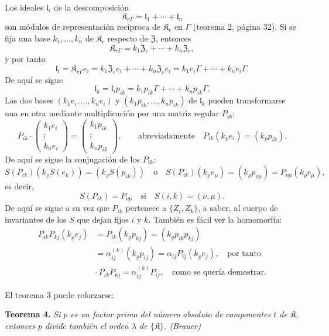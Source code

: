 Los ideales \(\mathfrak l_i\) de la descomposición
\[
\mathfrak K_{r\Gamma}=\mathfrak l_1+\cdots+\mathfrak l_n
\]
son módulos de representación recíproca de \(\mathfrak K_r\) en \(\Gamma\) (teorema 2, página 32). Si se fija una base \(k_1,\ldots,k_n\) de \(\mathfrak K_r\) respecto de \(\mathfrak Z\), entonces
\[
\mathfrak K_{r\Gamma}=k_1\mathfrak Z_r+\cdots+k_n\mathfrak Z_r,
\]
y por tanto
\[
\mathfrak l_i=\mathfrak K_{r\Gamma}e_i
=k_1\mathfrak Z_r e_i+\cdots+k_n\mathfrak Z_r e_i
=k_1e_i\Gamma+\cdots+k_ne_i\Gamma.
\]
De aquí se sigue
\[
\mathfrak l_k=\mathfrak l_i p_{ik}
=k_1p_{ik}\Gamma+\cdots+k_np_{ik}\Gamma.
\]
Las dos bases \((k_1e_i,\ldots,k_ne_i)\) y \((k_1p_{ik},\ldots,k_np_{ik})\) de \(\mathfrak l_k\) pueden transformarse una en otra mediante multiplicación por una matriz regular \(P_{ik}\):
\[
P_{ik}\cdot
\begin{pmatrix}
k_1e_i\\ \vdots\\ k_ne_i
\end{pmatrix}
=
\begin{pmatrix}
k_1p_{ik}\\ \vdots\\ k_np_{ik}
\end{pmatrix},
\qquad
\text{abreviadamente}\quad
P_{ik}(k_\varrho e_i)=(k_\varrho p_{ik}).
\]
De aquí se sigue la conjugación de los \(P_{ik}\):
\[
S(P_{ik})(k_\varrho S(e_k))=(k_\varrho S(p_{ik}))
\quad\text{o}\quad
S(P_{ik})(k_\varrho e_\mu)=(k_\varrho p_{\nu\mu})
=P_{\nu\mu}(k_\varrho e_\mu),
\]
es decir,
\[
S(P_{ik})=P_{\nu\mu}\quad\text{si}\quad S(i,k)=(\nu,\mu).
\]
De aquí se sigue a su vez que \(P_{ik}\) pertenece a \(\{Z_i,Z_k\}\), a saber, al cuerpo de invariantes de los \(S\) que dejan fijos \(i\) y \(k\). También es fácil ver la homomorfía:
\[
\begin{split}
P_{ik}P_{kj}(k_\varrho e_j)
&=P_{ik}(k_\varrho p_{kj})
=(k_\varrho p_{ik}p_{kj})\\
&=\alpha_{ij}^{(k)}(k_\varrho p_{ij})
=\alpha_{ij}P_{ij}(k_\varrho e_j),
\quad\text{por tanto}\\
&\cdot\, P_{ik}P_{kj}=\alpha_{ij}^{(k)}P_{ij},
\quad\text{como se quería demostrar.}
\end{split}
\]

El teorema 3 puede reforzarse:

\textbf{Teorema 4.} \emph{Si \(p\) es un factor primo del número absoluto de componentes \(t\) de \(\mathfrak K\), entonces \(p\) divide también el orden \(\lambda\) de \(\{\mathfrak K\}\). (Brauer)}

